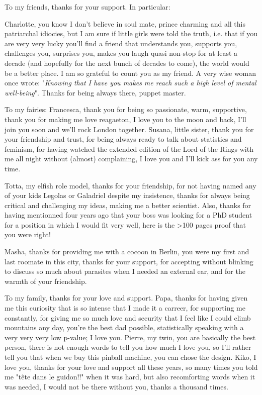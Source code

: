 To my friends, thanks for your support. In particular: \par
Charlotte, you know I don't believe in soul mate, prince charming and all this patriarchal idiocies, but I am sure if little girls were told the truth, i.e. that if you are very very lucky you'll find a friend that understands you, supports you, challenges you, surprises you, makes you laugh quasi non-stop for at least a decade (and hopefully for the next bunch of decades to come), the world would be a better place. I am so grateful to count you as my friend. A very wise woman once wrote: "\textit{Knowing that I have you makes me reach such a high level of mental well-being}". Thanks for being always there, puppet master.\par
To my fairies: Francesca, thank you for being so passionate, warm, supportive, thank you for making me love reagaeton, I love you to the moon and back, I'll join you soon and we'll rock London together. Susana, little sister, thank you for your friendship and trust, for being always ready to talk about statistics and feminism, for having watched the extended edition of the Lord of the Rings with me all night without (almost) complaining, I love you and I'll kick ass for you any time.\par
Totta, my elfish role model, thanks for your friendship, for not having named any of your kids Legolas or Galadriel despite my insistence, thanks for always being critical and challenging my ideas, making me a better scientist. Also, thanks for having mentionned four years ago that your boss was looking for a PhD student for a position in which I would fit very well, here is the >100 pages proof that you were right!\par
Masha, thanks for providing me with a cocoon in Berlin, you were my first and last roomate in this city, thanks for your support, for accepting without blinking to discuss so much about parasites when I needed an external ear, and for the warmth of your friendship.\par

To my family, thanks for your love and support. Papa, thanks for having given me this curiosity that is so intense that I made it a carreer, for supporting me constantly, for giving me so much love and security that I feel like I could climb mountains any day, you're the best dad possible, statistically speaking with a very very very low p-value; I love you. Pierre, my twin, you are basically the best person, there is not enough words to tell you how much I love you, so I'll rather tell you that when we buy this pinball machine, you can chose the design. Kiko, I love you, thanks for your love and support all these years, so many times you told me "tête dans le guidon!!" when it was hard, but also recomforting words when it was needed, I would not be there without you, thanks a thousand times.
